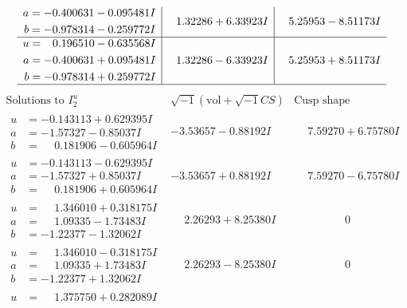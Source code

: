 \documentclass[1p]{elsarticle_modified}
\theoremstyle{definition}
\newcommand{\I}{\sqrt{-1}}
\begin{document}
$$\begin{array}{c|c|c}
\begin{aligned}
a &= -0.400631 - 0.095481 I \\
b &= -0.978314 - 0.259772 I\end{aligned}
 & \phantom{-}1.32286 + 6.33923 I & \phantom{-}5.25953 - 8.51173 I \\ \hline\begin{aligned}
u &= \phantom{-}0.196510 - 0.635568 I \\
a &= -0.400631 + 0.095481 I \\
b &= -0.978314 + 0.259772 I\end{aligned}
 & \phantom{-}1.32286 - 6.33923 I & \phantom{-}5.25953 + 8.51173 I\\
 \hline 
 \end{array}$$\newpage$$\begin{array}{c|c|c}  
\text{Solutions to }I^u_{2}& \I (\text{vol} + \sqrt{-1}CS) & \text{Cusp shape}\\
 \hline 
\begin{aligned}
u &= -0.143113 + 0.629395 I \\
a &= -1.57327 - 0.85037 I \\
b &= \phantom{-}0.181906 - 0.605964 I\end{aligned}
 & -3.53657 - 0.88192 I & \phantom{-}7.59270 + 6.75780 I \\ \hline\begin{aligned}
u &= -0.143113 - 0.629395 I \\
a &= -1.57327 + 0.85037 I \\
b &= \phantom{-}0.181906 + 0.605964 I\end{aligned}
 & -3.53657 + 0.88192 I & \phantom{-}7.59270 - 6.75780 I \\ \hline\begin{aligned}
u &= \phantom{-}1.346010 + 0.318175 I \\
a &= \phantom{-}1.09335 - 1.73483 I \\
b &= -1.22377 - 1.32062 I\end{aligned}
 & \phantom{-}2.26293 + 8.25380 I & \phantom{-0.000000 } 0 \\ \hline\begin{aligned}
u &= \phantom{-}1.346010 - 0.318175 I \\
a &= \phantom{-}1.09335 + 1.73483 I \\
b &= -1.22377 + 1.32062 I\end{aligned}
 & \phantom{-}2.26293 - 8.25380 I & \phantom{-0.000000 } 0 \\ \hline\begin{aligned}
u &= \phantom{-}1.375750 + 0.282089 I \\

\end{aligned}
\end{array}$$
\end{document}
